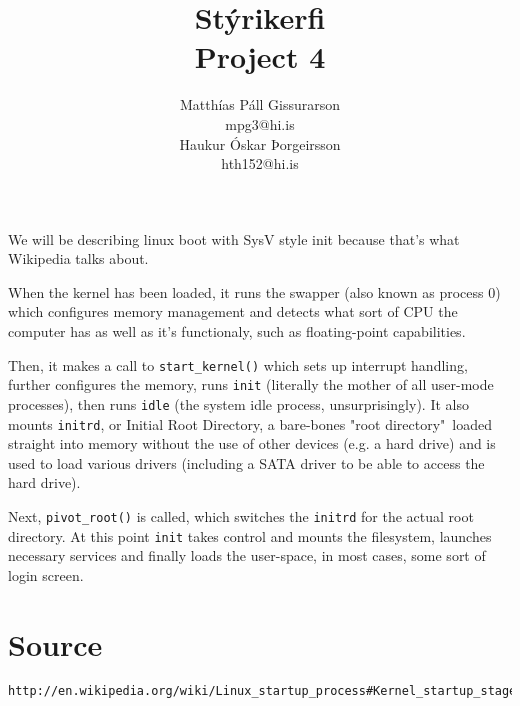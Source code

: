 \documentclass[10pt,a4paper]{article}
\newcommand{\ilc}{\lstinline}
\begin{document}
\title{Stýrikerfi\\Project 4}
\author{Matthías Páll Gissurarson\\mpg3@hi.is\\Haukur Óskar Þorgeirsson\\hth152@hi.is}
\maketitle

We will be describing linux boot with SysV style init because that's what Wikipedia talks about.

When the kernel has been loaded, it runs the swapper (also known as process 0) which configures memory management and detects what sort of CPU the computer has as well as it's functionaly, such as floating-point capabilities.

Then, it makes a call to \lstinline{start_kernel()} which sets up interrupt handling, further configures the memory, runs \lstinline{init} (literally the mother of all user-mode processes), then runs \lstinline{idle} (the system idle process, unsurprisingly). It also mounts \lstinline{initrd}, or Initial Root Directory, a bare-bones "root directory"\ loaded straight into memory without the use of other devices (e.g. a hard drive) and is used to load various drivers (including a SATA driver to be able to access the hard drive).

Next, \lstinline{pivot_root()} is called, which switches the \lstinline{initrd} for the actual root directory. At this point \ilc{init} takes control and mounts the filesystem, launches necessary services and finally loads the user-space, in most cases, some sort of login screen.


\section*{Source}
\begin{verbatim}
http://en.wikipedia.org/wiki/Linux_startup_process#Kernel_startup_stage
\end{verbatim}
\end{document}
